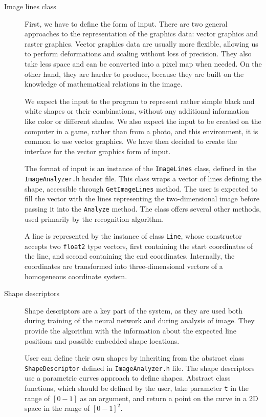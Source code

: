 \begin{description}
\item [Image lines class]
First, we have to define the form of input. There are two general approaches to the representation of the graphics data: vector graphics and raster graphics. Vector graphics data are usually more flexible, allowing us to perform deformations and scaling without loss of precision. They also take less space and can be converted into a pixel map when needed. On the other hand, they are harder to produce, because they are built on the knowledge of mathematical relations in the image. 

We expect the input to the program to represent rather simple black and white shapes or their combinations, without any additional information like color or different shades. We also expect the input to be created on the computer in a game, rather than from a photo, and this environment, it is common to use vector graphics. We have then decided to create the interface for the vector graphics form of input.

The format of input is an instance of the \texttt{ImageLines} class, defined in the \texttt{ImageAnalyzer.h} header file. This class wraps a vector of lines defining the shape, accessible through \texttt{GetImageLines} method. The user is expected to fill the vector with the lines representing the two-dimensional image before passing it into the \texttt{Analyze} method. The class offers several other methods, used primarily by the recognition algorithm. 

A line is represented by the instance of class \texttt{Line}, whose constructor accepts two \texttt{float2} type vectors, first containing the start coordinates of the line, and second containing the end coordinates. Internally, the coordinates are transformed into three-dimensional vectors of a homogeneous coordinate system. 

\item [Shape descriptors]
Shape descriptors are a key part of the system, as they are used both during training of the neural network and during analysis of image. They provide the algorithm with the information about the expected line positions and possible embedded shape locations.

User can define their own shapes by inheriting from the abstract class \texttt{ShapeDescriptor} defined in \texttt{ImageAnalyzer.h} file. The shape descriptors use a parametric curves approach to define shapes. Abstract class functions, which should be defined by the user, take parameter \texttt{t} in the range of $[0-1]$ as an argument, and return a point on the curve in a 2D space in the range of $[0-1]^2$.


\end{description}
